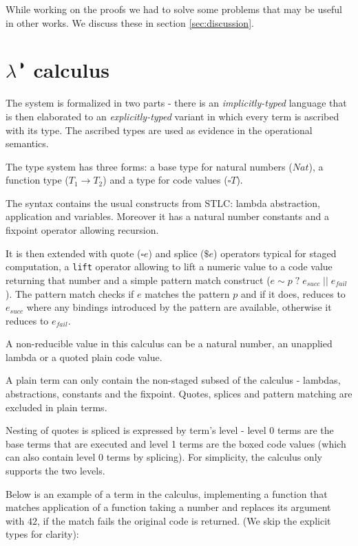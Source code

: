 \documentclass[runningheads]{article}
\begin{document}
While working on the proofs we had to solve some problems that may be useful in other works. We discuss these in section \ref{sec:discussion}.

\section{$\lambda^{\RIGHTcircle}$ calculus}
\label{sec:calculus}

The system is formalized in two parts - there is an \textit{implicitly-typed} language that is then elaborated to an \textit{explicitly-typed} variant in which every term is ascribed with its type. The ascribed types are used as evidence in the operational semantics.

The type system has three forms: a base type for natural numbers ($Nat$), a function type ($T_1 \to T_2$) and a type for code values ($\square T$).

The syntax contains the usual constructs from STLC: lambda abstraction, application and variables. Moreover it has a natural number constants and a fixpoint operator allowing recursion.

It is then extended with quote ($\square e$) and splice ($\$e$) operators typical for staged computation, a \verb|lift| operator allowing to lift a numeric value to a code value returning that number and a simple pattern match construct ($e \sim p \; ? \; e_{succ} \; || \; e_{fail}$).
The pattern match checks if $e$ matches the pattern $p$ and if it does, reduces to $e_{succ}$ where any bindings introduced by the pattern are available, otherwise it reduces to $e_{fail}$.

A non-reducible value in this calculus can be a natural number, an unapplied lambda or a quoted plain code value. 

A plain term can only contain the non-staged subsed of the calculus - lambdas, abstractions, constants and the fixpoint. Quotes, splices and pattern matching are excluded in plain terms.

Nesting of quotes is spliced is expressed by term's level - level 0 terms are the base terms that are executed and level 1 terms are the boxed code values (which can also contain level 0 terms by splicing). For simplicity, the calculus only supports the two levels.

Below is an example of a term in the calculus, implementing a function that matches application of a function taking a number and replaces its argument with $42$, if the match fails the original code is returned. (We skip the explicit types for clarity):
\end{document}
